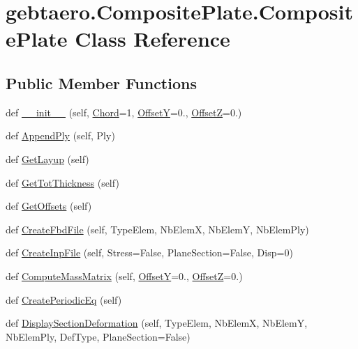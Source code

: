 \hypertarget{classgebtaero_1_1_composite_plate_1_1_composite_plate}{}\section{gebtaero.\+Composite\+Plate.\+Composite\+Plate Class Reference}
\label{classgebtaero_1_1_composite_plate_1_1_composite_plate}
\subsection*{Public Member Functions}
\begin{DoxyCompactItemize}
\item 
def \hyperlink{classgebtaero_1_1_composite_plate_1_1_composite_plate_a067ac11419d1959770398cce5de0a561}{\+\_\+\+\_\+init\+\_\+\+\_\+} (self, \hyperlink{classgebtaero_1_1_composite_plate_1_1_composite_plate_a60ae01b006e99e542c3759058e82e4cb}{Chord}=1, \hyperlink{classgebtaero_1_1_composite_plate_1_1_composite_plate_a33de8af0e1aaff88563310459b3b6f6b}{OffsetY}=0., \hyperlink{classgebtaero_1_1_composite_plate_1_1_composite_plate_aaf910e794c2f390a539b41a90dd30c83}{OffsetZ}=0.)
\item 
def \hyperlink{classgebtaero_1_1_composite_plate_1_1_composite_plate_ab41dbc2cc5c5a502f3b1d4b9bc51fbf5}{Append\+Ply} (self, Ply)
\item 
def \hyperlink{classgebtaero_1_1_composite_plate_1_1_composite_plate_a37b3c4c3dc5cd919ccfc06828448911b}{Get\+Layup} (self)
\item 
def \hyperlink{classgebtaero_1_1_composite_plate_1_1_composite_plate_a093864b1001bc131f474adbd543390c6}{Get\+Tot\+Thickness} (self)
\item 
def \hyperlink{classgebtaero_1_1_composite_plate_1_1_composite_plate_a179bd2f7f860afe99ab99e928fa12d11}{Get\+Offsets} (self)
\item 
def \hyperlink{classgebtaero_1_1_composite_plate_1_1_composite_plate_a4225c3b5b70c5e76260434da2403e77d}{Create\+Fbd\+File} (self, Type\+Elem, Nb\+ElemX, Nb\+ElemY, Nb\+Elem\+Ply)
\item 
def \hyperlink{classgebtaero_1_1_composite_plate_1_1_composite_plate_ab2aef5a02f71d8f508d4a8f1684295fd}{Create\+Inp\+File} (self, Stress=False, Plane\+Section=False, Disp=0)
\item 
def \hyperlink{classgebtaero_1_1_composite_plate_1_1_composite_plate_a13b1222bb715056417c9db9903d264a2}{Compute\+Mass\+Matrix} (self, \hyperlink{classgebtaero_1_1_composite_plate_1_1_composite_plate_a33de8af0e1aaff88563310459b3b6f6b}{OffsetY}=0., \hyperlink{classgebtaero_1_1_composite_plate_1_1_composite_plate_aaf910e794c2f390a539b41a90dd30c83}{OffsetZ}=0.)
\item 
def \hyperlink{classgebtaero_1_1_composite_plate_1_1_composite_plate_a682fc7d2f0aca5dafbb381c95f437962}{Create\+Periodic\+Eq} (self)
\item 
def \hyperlink{classgebtaero_1_1_composite_plate_1_1_composite_plate_a4b6d1680426eb3db77f3860dbae58307}{Display\+Section\+Deformation} (self, Type\+Elem, Nb\+ElemX, Nb\+ElemY, Nb\+Elem\+Ply, Def\+Type, Plane\+Section=False)
\end{DoxyCompactItemize}
